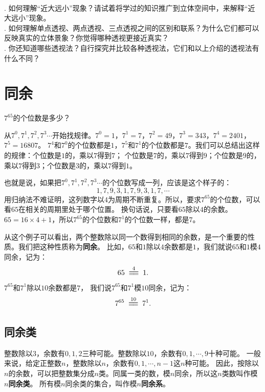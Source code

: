 \documentclass[12pt,UTF8]{ctexbook}
\begin{document}
\begin{sk}
    \mbox{}\\
    . 如何理解“近大远小”现象？请试着将学过的知识推广到立体空间中，来解释“近大远小”现象。\\
    . 如何理解单点透视、两点透视、三点透视之间的区别和联系？为什么它们都可以反映真实的立体景象？你觉得哪种透视更接近真实？\\
    . 你还知道哪些透视法？自行探究并比较各种透视法，它们和以上介绍的透视法有什么不同？
\end{sk}

\chapter{同余}
\begin{ex}\label{ex:3-0-0}
    $7^{65}$的个位数是多少？
\end{ex}
\begin{so}
    从$7^0,7^1,7^2,7^3\cdots$开始找规律。$7^0=1$，$7^1=7$，$7^2=49$，$7^3=343$，$7^4=2401$，$7^5=16807$。
    $7^4$和$7^0$的个位数都是$1$，$7^5$和$7^1$的个位数都是$7$。我们可以总结出这样的规律：个位数是$1$的，乘以$7$得到$7$；
    个位数是$7$的，乘以$7$得到$9$；个位数是$9$的，乘以$7$得到$3$；个位数是$3$的，乘以$7$得到$1$。

    也就是说，如果把$7^0,7^1,7^2,7^3\cdots$的个位数写成一列，应该是这个样子的：
    $$ 1, 7, 9, 3, 1, 7, 9, 3, 1, 7, \cdots$$
    用归纳法不难证明，这列数字以$4$为周期不断重复。所以，要求$7^{65}$的个位数，可以看$65$在相关的周期里处于哪个位置。
    换句话说，只要看$65$除以$4$的余数。$65 = 16 \times 4 + 1$，所以$7^{65}$的个位数和$7^1$的个位数一样，都是$7$。
\end{so}

从这个例子可以看出，两个整数除以同一个数得到相同的余数，是一个重要的性质。我们把这种性质称为\textbf{同余}。
比如，$65$和$1$除以$4$余数都是$1$，我们就说$65$和$1$模$4$同余，记为：
$$ 65 \tong{4} 1. $$
$7^{65}$和$7^1$除以$10$余数都是$7$，
我们说$7^{65}$和$7^1$模$10$同余，记为：
$$ 7^{65} \tong{10} 7^1. $$  %

\section{同余类}
整数除以$3$，余数有$0,1,2$三种可能。整数除以$10$，余数有$0,1,\cdots , 9$十种可能。
一般来说，给定正整数$n$，整数除以$n$，余数有$0,1,\cdots , n-1$这$n$种可能。
因此，按除以$n$的余数，可以把整数集分成$n$类。同属一类的数，模$n$同余，所以这$n$类数叫作模$n$\textbf{同余类}。
所有模$n$同余类的集合，叫作模$n$\textbf{同余系}。
\end{document}
